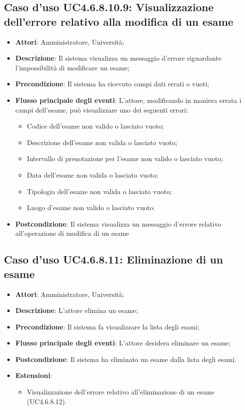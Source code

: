\subsection{Caso d'uso \texorpdfstring{UC4.6.8.10.9}{UC4.6.8.10.9}: Visualizzazione dell'errore relativo alla modifica di un esame}
\begin{itemize}
	\item \textbf{Attori}: Amministratore, Università;
	\item \textbf{Descrizione}: Il sistema visualizza un messaggio d'errore riguardante l'impossibilità di modificare un esame;
	
	\item \textbf{Precondizione}: Il sistema ha ricevuto campi dati errati o vuoti;
	
	
	\item \textbf{Flusso principale degli eventi}: L'attore, modificando in maniera errata i campi dell'esame, può visualizzare uno dei seguenti errori: \begin{itemize} 
		\item Codice dell’esame non valido o lasciato vuoto; 
		\item Descrizione dell’esame non valida o lasciato vuoto; 
		\item Intervallo di prenotazione per l’esame non valido o lasciato vuoto; 
		\item Data dell’esame non valida o lasciato vuoto; 
		\item Tipologia dell’esame non valida o lasciato vuoto; 
		\item Luogo d’esame non valido o lasciato vuoto.
	\end{itemize}
	\item \textbf{Postcondizione}: Il sistema visualizza un messaggio d'errore relativo all'operazione di modifica di un esame
	
	
\end{itemize}
\subsection{Caso d'uso \texorpdfstring{UC4.6.8.11}{UC4.6.8.11}: Eliminazione di un esame}
\begin{itemize}
	\item \textbf{Attori}: Amministratore, Università;
	\item \textbf{Descrizione}: L'attore elimina un esame;
	
	\item \textbf{Precondizione}: Il sistema fa visualizzare la lista degli esami;
	
	\item \textbf{Flusso principale degli eventi}: L'attore desidera eliminare un esame;
	
	\item \textbf{Postcondizione}: Il sistema ha eliminato un esame dalla lista degli esami.
	
	\item \textbf{Estensioni}:
	\begin{itemize}
		\item Visualizzazione dell'errore relativo all'eliminazione di un esame (UC4.6.8.12).
	\end{itemize}
\end{itemize}
